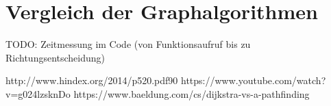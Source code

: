 \section{Vergleich der Graphalgorithmen}
TODO: Zeitmessung im Code (von Funktionsaufruf bis zu Richtungsentscheidung)


http://www.hindex.org/2014/p520.pdf90
https://www.youtube.com/watch?v=g024lzsknDo
https://www.baeldung.com/cs/dijkstra-vs-a-pathfinding